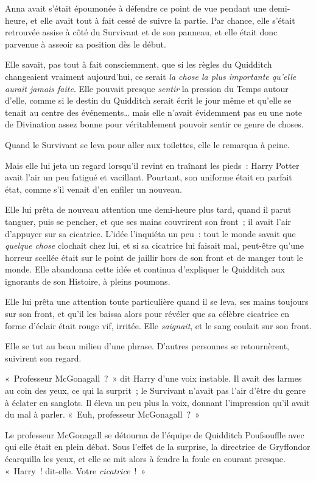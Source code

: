 Anna avait s'était époumonée à défendre ce point de vue pendant une demi-heure, et elle avait tout à fait cessé de suivre la partie.
Par chance, elle s'était retrouvée assise à côté du Survivant et de son panneau, et elle était donc parvenue à asseoir sa position dès le début.

Elle savait, pas tout à fait consciemment, que si les règles du Quidditch changeaient vraiment aujourd'hui, ce serait \emph{la chose la plus importante qu'elle aurait jamais faite}.
Elle pouvait presque \emph{sentir} la pression du Temps autour d'elle, comme si le destin du Quidditch serait écrit le jour même et qu'elle se tenait au centre des événements… mais elle n'avait évidemment pas eu une note de Divination assez bonne pour véritablement pouvoir sentir ce genre de choses.

Quand le Survivant se leva pour aller aux toilettes, elle le remarqua à peine.

Mais elle lui jeta un regard lorsqu'il revint en traînant les pieds~: Harry Potter avait l'air un peu fatigué et vacillant.
Pourtant, son uniforme était en parfait état, comme s'il venait d'en enfiler un nouveau.

Elle lui prêta de nouveau attention une demi-heure plus tard, quand il parut tanguer, puis se pencher, et que ses mains couvrirent son front~; il avait l'air d'appuyer sur sa cicatrice.
L'idée l'inquiéta un peu~: tout le monde savait que \emph{quelque chose} clochait chez lui, et si sa cicatrice lui faisait mal, peut-être qu'une horreur scellée était sur le point de jaillir hors de son front et de manger tout le monde.
Elle abandonna cette idée et continua d'expliquer le Quidditch aux ignorants de son Histoire, à pleins poumons.

Elle lui prêta une attention toute particulière quand il se leva, ses mains toujours sur son front, et qu'il les baissa alors pour révéler que sa célèbre cicatrice en forme d'éclair était rouge vif, irritée.
Elle \emph{saignait}, et le sang coulait sur son front.

Elle se tut au beau milieu d'une phrase.
D'autres personnes se retournèrent, suivirent son regard.

«~Professeur McGonagall~?~»
dit Harry d'une voix instable.
Il avait des larmes au coin des yeux, ce qui la surprit~; le Survivant n'avait pas l'air d'être du genre à éclater en sanglots.
Il éleva un peu plus la voix, donnant l'impression qu'il avait du mal à parler.
«~Euh, professeur McGonagall~?~»

Le professeur McGonagall se détourna de l'équipe de Quidditch Poufsouffle avec qui elle était en plein débat.
Sous l'effet de la surprise, la directrice de Gryffondor écarquilla les yeux, et elle se mit alors à fendre la foule en courant presque.
«~Harry~! dit-elle.
Votre \emph{cicatrice}~!~»

